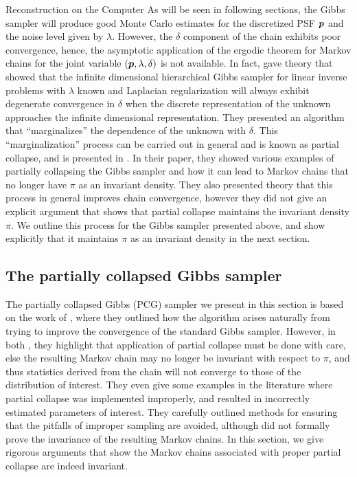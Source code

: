 \begin{chapter}{Reconstruction on the Computer}
As will be seen in following sections, the Gibbs sampler will produce good Monte Carlo estimates for the discretized PSF $\mbox{\boldmath$p$}$ and the noise level given by $\lambda$. 
However, the $\delta$ component of the chain exhibits poor convergence, hence, the asymptotic application of the ergodic theorem for Markov chains for the joint variable $(\mbox{\boldmath$p$},\lambda,\delta)$ is not available.
In fact, \citep{agapiou2014analysis} gave theory that showed that the infinite dimensional hierarchical Gibbs sampler for linear inverse problems with $\lambda$ known and Laplacian regularization will always exhibit degenerate convergence in $\delta$ when the discrete representation of the unknown approaches the infinite dimensional representation.
They presented an algorithm that ``marginalizes'' the dependence of the unknown with $\delta$.
This ``marginalization'' process can be carried out in general and is known as partial collapse, and is presented in \citep{van2008partially}.
In their paper, they showed various examples of partially collapsing the Gibbs sampler and how it can lead to Markov chains that no longer have $\pi$ as an invariant density.
They also presented theory that this process in general improves chain convergence, however they did not give an explicit argument that shows that partial collapse maintains the invariant density $\pi$.
We outline this process for the Gibbs sampler presented above, and show explicitly that it maintains $\pi$ as an invariant density in the next section.

\subsection{The partially collapsed Gibbs sampler}
The partially collapsed Gibbs (PCG) sampler we present in this section is based on the work of \citep{van2008partially,van2015metropolis}, where they outlined how the algorithm arises naturally from trying to improve the convergence of the standard Gibbs sampler.
However, in both \citep{van2008partially,van2015metropolis}, they highlight that application of partial collapse must be done with care, else the resulting Markov chain may no longer be invariant with respect to $\pi$, and thus statistics derived from the chain will not converge to those of the distribution of interest.
They even give some examples in the literature where partial collapse was implemented improperly, and resulted in incorrectly estimated parameters of interest.
They carefully outlined methods for ensuring that the pitfalls of improper sampling are avoided, although did not formally prove the invariance of the resulting Markov chains.
In this section, we give rigorous arguments that show the Markov chains associated with proper partial collapse are indeed invariant.


\end{chapter}
